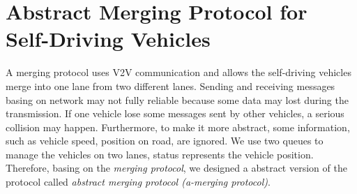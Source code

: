 \documentclass[10pt, conference, compsocconf]{IEEEtran}
\begin{document}











 
\section{Abstract Merging Protocol for Self-Driving Vehicles}
 \label{sect_reviproto}
 
A merging protocol uses V2V communication and allows the self-driving vehicles merge into one lane from two different lanes. 
Sending and receiving messages basing on network may not fully reliable because some data may lost during the transmission. 
If one vehicle lose some messages sent by other vehicles, a serious collision may happen. 
Furthermore, to make it more abstract, some information, such as vehicle speed, position on road, are ignored.
We use two queues to manage the vehicles on two lanes, status represents the vehicle position.
Therefore, basing on the \textit{merging protocol}, we designed a abstract version of the protocol called \textit{abstract merging protocol (a-merging protocol)}.
\end{document}
